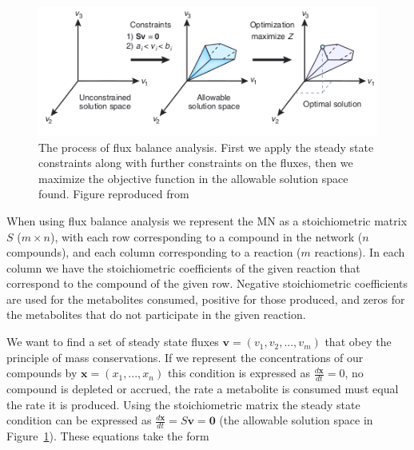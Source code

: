 \documentclass[a4paper,12pt]{article}
\begin{document}
	\begin{figure}[htpb]
		\centering
		\includegraphics[width=0.8\linewidth]{fba_frompaper.png}
		\caption{The process of flux balance analysis. First we apply the steady state constraints along with further constraints on the fluxes, then we maximize the objective function in the allowable solution space found. Figure reproduced from \cite[]{whatisfluxbalance} }
		\label{fig:fluxbalance}
	\end{figure}

	When using flux balance analysis we represent the MN as a stoichiometric matrix $S$ ($m\times n$), with each row corresponding to a compound in the network ($n$ compounds), and each column corresponding to a reaction ($m$ reactions). In each column we have the stoichiometric coefficients of the given reaction that correspond to the compound of the given row. Negative stoichiometric coefficients are used for the metabolites consumed, positive for those produced, and zeros for the metabolites that do not participate in the given reaction.
	
	We want to find a set of steady state fluxes $\mathbf{v}=\left( v_1,v_2,...,v_m \right)$ that obey the principle of mass conservations. If we represent the concentrations of our compounds by ${\mathbf{x}=\left( x_1, ... , x_n \right)}$ this condition is expressed as $\frac{d\mathbf{x}}{dt}=0$, no compound is depleted or accrued, the rate a metabolite is consumed must equal the rate it is produced. Using the stoichiometric matrix the steady state condition can be expressed as $\frac{d\mathbf{x}}{dt}= S\mathbf{v}=\mathbf{0}$ (the allowable solution space in Figure~\ref{fig:fluxbalance}). These equations take the form
	
\end{document}
